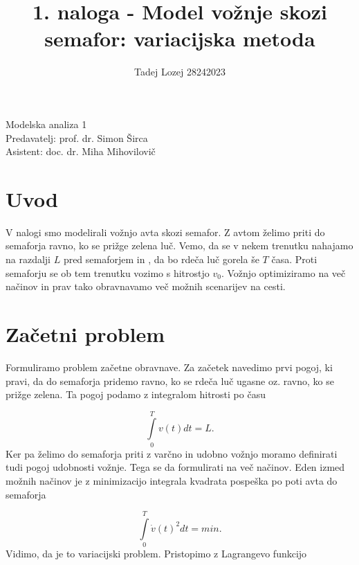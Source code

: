 \documentclass[slovene,11pt,a4paper]{article}
\begin{document}
\title{1. naloga - Model vožnje skozi semafor: variacijska metoda}
\author{Tadej Lozej 28242023}
\maketitle
\begin{center}
Modelska analiza 1 \\
\bigskip
Predavatelj: prof. dr. Simon Širca \\
Asistent: doc. dr. Miha Mihovilovič
\end{center}

\newpage

\tableofcontents

\newpage

\section{Uvod}


V nalogi smo modelirali vožnjo avta skozi semafor. Z avtom želimo priti do semaforja ravno, ko se prižge zelena luč. Vemo, da se v nekem trenutku nahajamo na razdalji $L$ pred semaforjem in , da bo rdeča luč gorela še $T$ časa. Proti semaforju se ob tem trenutku vozimo s hitrostjo $v_0$. Vožnjo optimiziramo na več načinov in prav tako obravnavamo več možnih scenarijev na cesti.

\section{Začetni problem}

Formuliramo problem začetne obravnave. Za začetek navedimo prvi pogoj, ki pravi, da do semaforja pridemo ravno, ko se rdeča luč ugasne oz. ravno, ko se prižge zelena. Ta pogoj podamo z integralom hitrosti po času

\begin{equation}
\int\limits_{0}^{T} v(t) dt = L.
\end{equation}
Ker pa želimo do semaforja priti z varčno in udobno vožnjo moramo definirati tudi pogoj udobnosti vožnje. Tega se da formulirati na več načinov. Eden izmed možnih načinov je z minimizacijo integrala kvadrata pospeška po poti avta do semaforja

\begin{equation}
\int\limits_{0}^{T} \dot{v}(t)^2 dt = min.
\end{equation}
Vidimo, da je to variacijski problem. Pristopimo z Lagrangevo funkcijo
\end{document}
